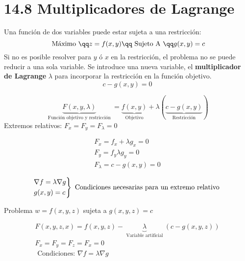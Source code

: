\section{14.8 Multiplicadores de Lagrange}
Una función de dos variables puede estar sujeta a una restricción:
\[
  \text{ Máximo } \qq  z= f(x,y) \qq \text{ Sujeto A } \qq g(x,y) = c
\]
Si no es posible resolver para $y$ ó $x$ en la restricción, el problema no se puede reducir a una sola variable. \newline 
Se introduce una nueva variable, el \textbf{multiplicador de Lagrange} $\lambda $ para incorporar la restricción en la función objetivo. 
\[
  c - g(x,y) = 0 
\]

\[
  \underbrace{F(x,y,\lambda )}_{\text{ Función objetivo y restricción }} = \underbrace{f(x,y)}_{\text{ Objetivo }} + \lambda (\underbrace{c-g(x,y)}_{\text{ Restricción }})
\]
Extremos relativos: $\displaystyle F_x = F_y = F_\lambda = 0$
\begin{center}
   \begin{align*}
       F_x = f_x + \lambda g_x = 0 \\ 
       F_y = f_y  \lambda g_y = 0 \\ 
       F_\lambda = c - g(x,y) = 0 \\ 
   \end{align*}
   \[
       \begin{rcases}
            \nabla f = \lambda \nabla g\\
            g(x,y) = c \\ 
       \end{rcases} \text{ Condiciones necesarias para un extremo relativo }
   \]
\end{center} 

Problema $\displaystyle w = f(x,y,z)$ sujeta a $\displaystyle g(x,y,z) = c$ 
\begin{center}
   \begin{align*}
       F(x,y,z,x) = f(x,y,z) - \underbrace{\lambda}_{\text{ Variable artificial }} (c-g(x,y,z)) \\ 
    F_x=F_y=F_z=F_x=0 \\ 
    \text{ Condiciones: } \nabla f = \lambda \nabla  g \\ 
   \end{align*}
\end{center}


